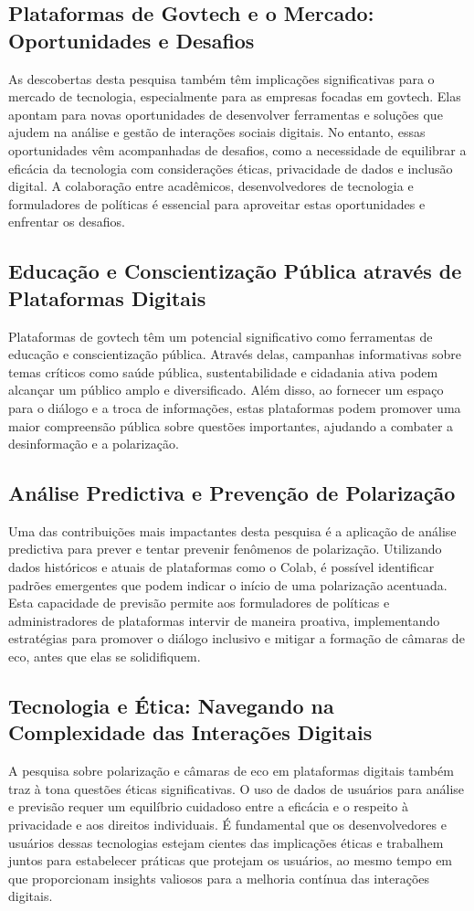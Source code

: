\subsection*{Plataformas de Govtech e o Mercado: Oportunidades e Desafios}
As descobertas desta pesquisa também têm implicações significativas para o mercado de tecnologia, especialmente para as empresas focadas em govtech. Elas apontam para novas oportunidades de desenvolver ferramentas e soluções que ajudem na análise e gestão de interações sociais digitais. No entanto, essas oportunidades vêm acompanhadas de desafios, como a necessidade de equilibrar a eficácia da tecnologia com considerações éticas, privacidade de dados e inclusão digital. A colaboração entre acadêmicos, desenvolvedores de tecnologia e formuladores de políticas é essencial para aproveitar estas oportunidades e enfrentar os desafios.

\subsection*{Educação e Conscientização Pública através de Plataformas Digitais}
Plataformas de govtech têm um potencial significativo como ferramentas de educação e conscientização pública. Através delas, campanhas informativas sobre temas críticos como saúde pública, sustentabilidade e cidadania ativa podem alcançar um público amplo e diversificado. Além disso, ao fornecer um espaço para o diálogo e a troca de informações, estas plataformas podem promover uma maior compreensão pública sobre questões importantes, ajudando a combater a desinformação e a polarização.

\subsection*{Análise Predictiva e Prevenção de Polarização}
Uma das contribuições mais impactantes desta pesquisa é a aplicação de análise predictiva para prever e tentar prevenir fenômenos de polarização. Utilizando dados históricos e atuais de plataformas como o Colab, é possível identificar padrões emergentes que podem indicar o início de uma polarização acentuada. Esta capacidade de previsão permite aos formuladores de políticas e administradores de plataformas intervir de maneira proativa, implementando estratégias para promover o diálogo inclusivo e mitigar a formação de câmaras de eco, antes que elas se solidifiquem.

\subsection*{Tecnologia e Ética: Navegando na Complexidade das Interações Digitais}
A pesquisa sobre polarização e câmaras de eco em plataformas digitais também traz à tona questões éticas significativas. O uso de dados de usuários para análise e previsão requer um equilíbrio cuidadoso entre a eficácia e o respeito à privacidade e aos direitos individuais. É fundamental que os desenvolvedores e usuários dessas tecnologias estejam cientes das implicações éticas e trabalhem juntos para estabelecer práticas que protejam os usuários, ao mesmo tempo em que proporcionam insights valiosos para a melhoria contínua das interações digitais.


